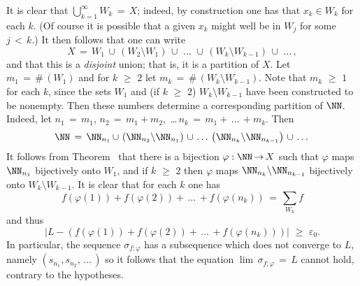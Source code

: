     It is clear that ${\bigcup}_{k=1}^{{\infty}} W_{k} \,=\, X$; indeed, by construction one has that $x_{k}{\in}W_{k}$ for each $k$.
    (Of course it is possible that a given $x_{k}$ might well be in $W_{j}$ for some $j\,<\,k$.)
    It then follows that one can write
        \begin{displaymath}
        X \,=\, W_{1}\,{\cup}\,\left(W_{2}{\setminus}W_{1}\right) \,{\cup}\,
    \,{\ldots}\, \,{\cup}\, \left(W_{k}{\setminus}W_{k-1}\right) \,{\cup}\, \,{\ldots}\,,
        \end{displaymath}
and that this is a {\em disjoint} union; that is, it is a partition of $X$. Let $m_{1} \,=\, \#\,(W_{1})$ and for $k\,\,{\geq}\,\,2$ let $m_{k} \,=\, \#\,(W_{k}{\setminus}W_{k-1})$.
    Note that $m_{k}\,\,{\geq}\,\,1$ for each $k$, since the sets $W_{1}$ and (if $k\,\,{\geq}\,\,2$) $W_{k}{\setminus}W_{k-1}$ have been constructed to be nonempty.
    Then these numbers determine a corresponding partition of ${\NN}$. Indeed, let $n_{1} \,=\, m_{1}$, $n_{2} \,=\, m_{1}+m_{2}$, \,{\ldots}\,$n_{k} \,=\, m_{1} + \,{\ldots}\,+ m_{k}$. Then
        \begin{displaymath}
        {\NN} \,=\, {\NN}_{n_{1}}\,{\cup}\,\left({\NN}_{n_{2}}{\setminus}{\NN}_{n_{1}}\right)\,{\cup}\,\,{\ldots}\,\left({\NN}_{n_{k}}{\setminus}{\NN}_{n_{k-1}}\right)\,{\cup}\,\,{\ldots}\,
        \end{displaymath}
    It follows from Theorem~ that there is a bijection ${\varphi}:{\NN} \,{\rightarrow}\, X$ such that ${\varphi}$ maps ${\NN}_{n_{1}}$ bijectively onto $W_{1}$,
    and if $k\,\,{\geq}\,\,2$ then ${\varphi}$ maps ${\NN}_{n_{k}}{\setminus}{\NN}_{n_{k-1}}$ bijectively onto $W_{k}{\setminus}W_{k-1}$.
    It is clear that for each $k$ one has
        \begin{displaymath}
        f({\varphi}(1)) + f({\varphi}(2)) + \,{\ldots}\, + f({\varphi}(n_{k})) \,=\, \sum_{W_{k}} f
        \end{displaymath}
    and thus
        \begin{displaymath}
        \left|L - \left(f({\varphi}(1)) + f({\varphi}(2)) + \,{\ldots}\, + f({\varphi}(n_{k}))\right)\right|\,\,{\geq}\,\,{\varepsilon}_{0}.
        \end{displaymath}
    In particular, the sequence ${\sigma}_{f;{\varphi}}$ has a subsequence which does not converge to $L$, namely $(s_{n_{1}}, s_{n_{2}},\,{\ldots}\,)$
    so it follows that the equation $\lim\,{\sigma}_{f;{\varphi}} \,=\, L$ cannot hold, contrary to the hypotheses.

